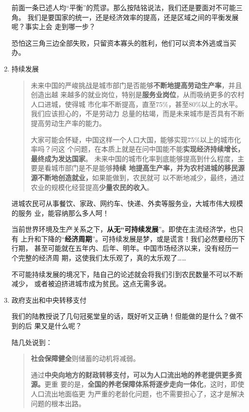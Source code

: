 \begin{enumerate}
  前面一条已述人均“平衡”的荒谬。那么按陆铭说法，我们还是要面对不可能三角。
  我们是要国家的统一，还是经济效率的提高，还是区域之间的平衡发展呢？事实上会
  走到哪一步？

  恐怕这三角三边全部失败，只留资本寡头的胜利，他们可以资本外逃或当买办。

\item 持续发展

  \begin{quotation}
    未来中国的严峻挑战是城市部门是否能够\textbf{不断地提高劳动生产率}，并且创造出越
    来越多的就业岗位，特别是\textbf{服务业岗位}，从而吸纳更多的农村人口进城，使得城
    市化率不断提高，直至75\%，甚至80\%以上的水平。我们应该担心的，不是劳动力
    总量的枯竭，而是未来城市是否具有不断提高劳动生产率的能力。

    大家可能会怀疑，中国这样一个人口大国，能够实现75\%以上的城市化率吗？问这
    个问题，在本质上就是在问中国能不能\textbf{实现经济持续增长，最终成为发达国家}。
    未来中国的城市化率到底能够提高到什么程度，主要是看城市部门是不是能够\textbf{持续
    地提高生产率，并为农村进城的移民源源不断地创造就业，}如果能做到，农民就可
    以不断地减少，最终，通过农业的规模化经营提高\textbf{少量农民的收入}。
  \end{quotation}

  进城农民可从事餐饮、家政、网约车、快递、外卖等服务业，大城市伟大规模的服务
  业，能容纳那么多人呵！

  当前世界环境及生产关系之下，\textbf{从无“可持续发展}”。即使在主流经济学，也只有
  上升和下降的“\textbf{经济周期}”。可持续发展是梦，或是谎言！我们必然要经历下行期，
  甚至可能就在五年内、后年、明年。中国市场经济以来，没有经历一个完整的经济周
  期，这使我们太乐观了，真的太乐观了……

  不可能持续发展的境况下，陆自己的论述就会将我们引到农民数量不可以不断减少，
  或者被迫挤进城市成为贫民。这点无需多说。

\item 政府支出和中央转移支付

  我们的陆教授说了几句冠冕堂皇的话，既好听又正确！但能做的是什么？做不到的后
  果又是什么呢？

  陆几处说到：
  \begin{quotation}
    \textbf{社会保障健全}则储蓄的动机将减弱。

    通过\textbf{中央向地方的财政转移支付，可以为人口流出地的养老提供更多资源。}更重
    要的是，\textbf{全国的养老保障体系将逐步走向一体化}，这时，即使人口流出地面临更
    为严重的老龄化问题，也不需要担心了，这才是解决问题的根本出路。


\end{quotation}
\end{enumerate}
